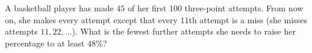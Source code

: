 A basketball player has made $45$ of her first $100$ three-point attempts. From now on, she makes every attempt except that every $11$th attempt is a miss (she misses attempts $11,22,\dots$). What is the fewest further attempts she needs to raise her percentage to at least $48\%$?
